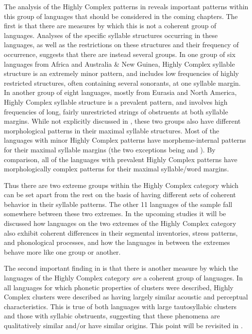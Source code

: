 The analysis of the Highly Complex patterns in  reveals important patterns within this group of languages that should be considered in the coming chapters. The first is that there are measures by which this is not a coherent group of languages. Analyses of the specific syllable structures occurring in these languages, as well as the restrictions on these structures and their frequency of occurrence, suggests that there are instead several groups. In one group of six languages from Africa and Australia \& New Guinea, Highly Complex syllable structure is an extremely minor pattern, and includes low frequencies of highly restricted structures, often containing several sonorants, at one syllable margin. In another group of eight languages, mostly from Eurasia and North America, Highly Complex syllable structure is a prevalent pattern, and involves high frequencies of long, fairly unrestricted strings of obstruents at both syllable margins. While not explicitly discussed in , these two groups also have different morphological patterns in their maximal syllable structures. Most of the languages with minor Highly Complex patterns have morpheme-internal patterns for their maximal syllable margins (the two exceptions being  and ). By comparison, all of the languages with prevalent Highly Complex patterns have morphologically complex patterns for their maximal syllable/word margins.

Thus there are two extreme groups within the Highly Complex category which can be set apart from the rest on the basis of having different sets of coherent behavior in their syllable patterns. The other 11 languages of the sample fall somewhere between these two extremes. In the upcoming studies it will be discussed how languages on the two extremes of the Highly Complex category also exhibit coherent differences in their segmental inventories, stress patterns, and phonological processes, and how the languages in between the extremes behave more like one group or another.

The second important finding in  is that there is another measure by which the languages of the Highly Complex category \textit{are} a coherent group of languages. In all languages for which phonetic properties of clusters were described, Highly Complex clusters were described as having largely similar acoustic and perceptual characteristics. This is true of both languages with large tautosyllabic clusters and those with syllabic obstruents, suggesting that these phenomena are qualitatively similar and/or have similar origins. This point will be revisited in .

